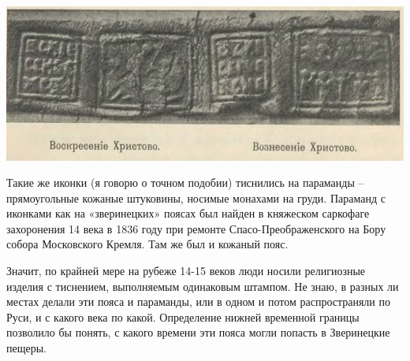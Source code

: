 \begin{center}
\includegraphics[width=\linewidth]{chast-colebanie-osnov/nachalo/tis01.jpg}
\end{center}

Такие же иконки (я говорю о точном подобии) тиснились на параманды – прямоугольные кожаные штуковины, носимые монахами на груди. Параманд с иконками как на «зверинецких» поясах был найден в княжеском саркофаге захоронения 14 века в 1836 году при ремонте Спасо-Преображенского на Бору собора Московского Кремля. Там же был и кожаный пояс.

Значит, по крайней мере на рубеже 14-15 веков люди носили религиозные изделия с тиснением, выполняемым одинаковым штампом. Не знаю, в разных ли местах делали эти пояса и параманды, или в одном и потом распространяли по Руси, и с какого века по какой. Определение нижней временной границы позволило бы понять, с какого времени эти пояса могли попасть в Зверинецкие пещеры.

